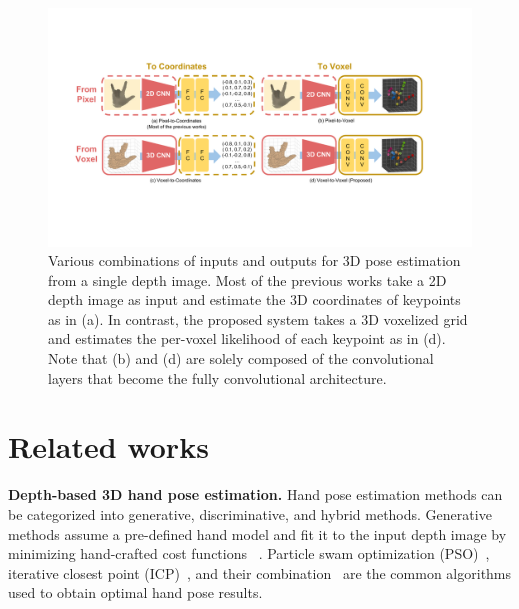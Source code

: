 \begin{figure}
\begin{center}
\includegraphics[width=1.0\linewidth]{comparison_io_type.pdf}
\end{center}
\vspace*{-5mm}
   \caption{Various combinations of inputs and outputs for 3D pose estimation from a single depth image. Most of the previous works take a 2D depth image as input and estimate the 3D coordinates of keypoints as in (a). In contrast, the proposed system takes a 3D voxelized grid and estimates the per-voxel likelihood of each keypoint as in (d). Note that (b) and (d) are solely composed of the convolutional layers that become the fully convolutional architecture.}
\label{fig:comparison_io_type}
\end{figure}

\section{Related works}

{\bf Depth-based 3D hand pose estimation.} 
Hand pose estimation methods can be categorized into generative, discriminative, and hybrid methods. Generative methods assume a pre-defined hand model and fit it to the input depth image by minimizing hand-crafted cost functions ~\cite{sharp2015accurate, tang2015opening}. Particle swam optimization (PSO)~\cite{sharp2015accurate}, iterative closest point (ICP)~\cite{tagliasacchi2015robust}, and their combination~\cite{qian2014realtime} are the common algorithms used to obtain optimal hand pose results.

